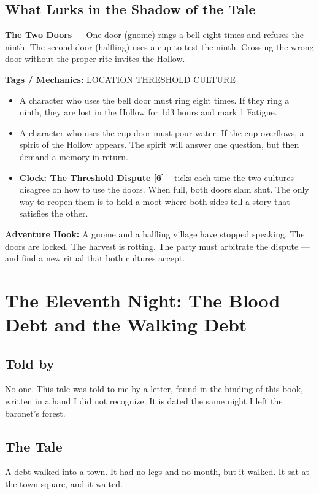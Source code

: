 \documentclass[10pt,twoside]{book}
\newcommand{\tag}[1]{\textsc{#1}}
\begin{document}
\section*{What Lurks in the Shadow of the Tale}
\begin{infobox}
\textbf{The Two Doors} --- One door (gnome) rings a bell eight times and refuses the ninth. The second door (halfling) uses a cup to test the ninth. Crossing the wrong door without the proper rite invites the Hollow.

\textbf{Tags / Mechanics:} \tag{LOCATION} \tag{THRESHOLD} \tag{CULTURE}

\begin{itemize}
\item A character who uses the bell door must ring eight times. If they ring a ninth, they are lost in the Hollow for 1d3 hours and mark 1 Fatigue.
\item A character who uses the cup door must pour water. If the cup overflows, a spirit of the Hollow appears. The spirit will answer one question, but then demand a memory in return.
\item \textbf{Clock: The Threshold Dispute [6]} -- ticks each time the two cultures disagree on how to use the doors. When full, both doors slam shut. The only way to reopen them is to hold a moot where both sides tell a story that satisfies the other.
\end{itemize}

\textbf{Adventure Hook:} A gnome and a halfling village have stopped speaking. The doors are locked. The harvest is rotting. The party must arbitrate the dispute --- and find a new ritual that both cultures accept.
\end{infobox}

\chapter{The Eleventh Night: The Blood Debt and the Walking Debt}

\section*{Told by}
No one. This tale was told to me by a letter, found in the binding of this book, written in a hand I did not recognize. It is dated the same night I left the baronet's forest.

\section*{The Tale}
A debt walked into a town. It had no legs and no mouth, but it walked. It sat at the town square, and it waited.
\end{document}
